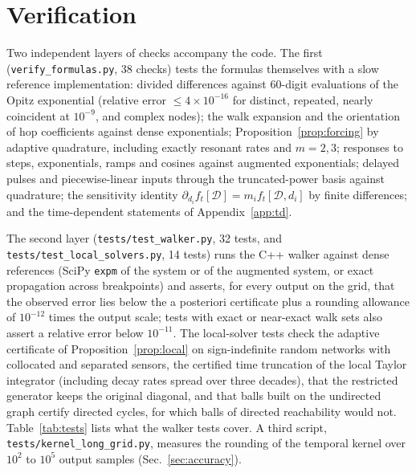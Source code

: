 \section{Verification}\label{app:verification}

Two independent layers of checks accompany the code. The first (\texttt{verify\_formulas.py}, 38 checks) tests the formulas themselves with a slow reference implementation: divided differences against 60-digit evaluations of the Opitz exponential (relative error $\le4\times10^{-16}$ for distinct, repeated, nearly coincident at $10^{-9}$, and complex nodes); the walk expansion and the orientation of hop coefficients against dense exponentials; Proposition~\ref{prop:forcing} by adaptive quadrature, including exactly resonant rates and $m=2,3$; responses to steps, exponentials, ramps and cosines against augmented exponentials; delayed pulses and piecewise-linear inputs through the truncated-power basis against quadrature; the sensitivity identity $\partial_{d_i}f_t[\mathcal{D}]=m_if_t[\mathcal{D},d_i]$ by finite differences; and the time-dependent statements of Appendix~\ref{app:td}.

The second layer (\texttt{tests/test\_walker.py}, 32 tests, and \texttt{tests/test\_local\_solvers.py}, 14 tests) runs the C++ walker against dense references (SciPy \texttt{expm} of the system or of the augmented system, or exact propagation across breakpoints) and asserts, for every output on the grid, that the observed error lies below the a posteriori certificate plus a rounding allowance of $10^{-12}$ times the output scale; tests with exact or near-exact walk sets also assert a relative error below $10^{-11}$. The local-solver tests check the adaptive certificate of Proposition~\ref{prop:local} on sign-indefinite random networks with collocated and separated sensors, the certified time truncation of the local Taylor integrator (including decay rates spread over three decades), that the restricted generator keeps the original diagonal, and that balls built on the undirected graph certify directed cycles, for which balls of directed reachability would not. Table~\ref{tab:tests} lists what the walker tests cover. A third script, \texttt{tests/kernel\_long\_grid.py}, measures the rounding of the temporal kernel over $10^2$ to $10^5$ output samples (Sec.~\ref{sec:accuracy}).

